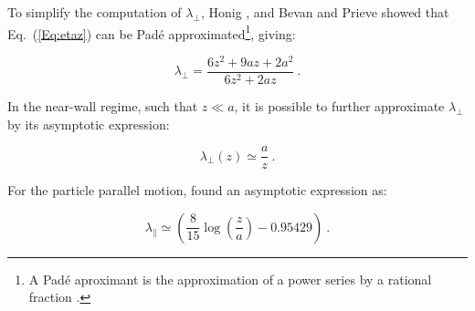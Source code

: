 To simplify the computation of $\lambda_\bot$, Honig \cite{honig_effect_1971}, and Bevan and Prieve \cite{bevan_hindered_2000} showed that Eq.~(\ref{Eq:etaz}) can be Padé approximated\footnote{A Padé aproximant is the approximation of a power series by a rational fraction \cite{baker_pade_1996}.}, giving:

\begin{equation}
	\lambda_\bot =  \frac{6z^2 + 9az + 2a^2}{6z^2 + 2az}~.
	\label{Eq:etaz_pade}
\end{equation}

In the near-wall regime, such that $z \ll a$, it is possible to further approximate $\lambda_\bot$ by its asymptotic expression:

\begin{equation}
	\lambda_\bot (z) \simeq \frac{a}{z} ~.
	\label{Eq:etaz_small}
\end{equation}

For the particle parallel motion, \cite{oneill_slow_1967, chaoui_creeping_2003} found an asymptotic expression as:

\begin{equation}
	\lambda _\parallel \simeq \left(\frac{8}{15}\log\left(\frac{z}{a}\right) - 0.95429\right)~.
	\label{Eq.etax_small}
\end{equation} 


